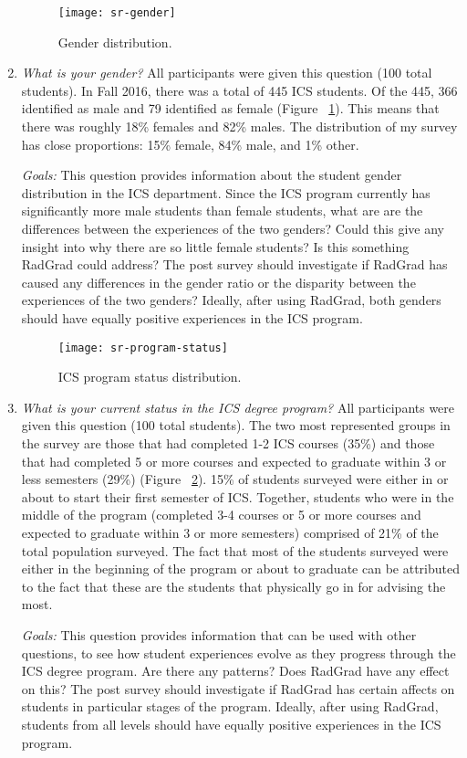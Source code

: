\begin{enumerate}
\begin{figure}[h]
\centering
\texttt{[image: sr-gender]}
\caption{Gender distribution.}
\label{gender}
\end{figure}
\item \textit{What is your gender?}
All participants were given this question (100 total students). In Fall 2016, there was a total of 445 ICS students. Of the 445, 366 identified as male and 79 identified as female (Figure ~\ref{gender}). This means that there was roughly 18\% females and 82\% males. The distribution of my survey has close proportions: 15\% female, 84\% male, and 1\% other. 

\textit{Goals:} This question provides information about the student gender distribution in the ICS department. Since the ICS program currently has significantly more male students than female students, what are are the differences between the experiences of the two genders? Could this give any insight into why there are so little female students? Is this something RadGrad could address? The post survey should investigate if RadGrad has caused any differences in the gender ratio or the disparity between the experiences of the two genders? Ideally, after using RadGrad, both genders should have equally positive experiences in the ICS program.
\begin{figure}[h]
\centering
\texttt{[image: sr-program-status]}
\caption{ICS program status distribution.}
\label{status}
\end{figure}
\item \textit{What is your current status in the ICS degree program?}
All participants were given this question (100 total students). The two most represented groups in the survey are those that had completed 1-2 ICS courses (35\%) and those that had completed 5 or more courses and expected to graduate within 3 or less semesters (29\%) (Figure ~\ref{status}). 15\% of students surveyed were either in or about to start their first semester of ICS. Together, students who were in the middle of the program (completed 3-4 courses or 5 or more courses and expected to graduate within 3 or more semesters) comprised of 21\% of the total population surveyed. The fact that most of the students surveyed were either in the beginning of the program or about to graduate can be attributed to the fact that these are the students that physically go in for advising the most. 

\textit{Goals:} This question provides information that can be used with other questions, to see how student experiences evolve as they progress through the ICS degree program. Are there any patterns? Does RadGrad have any effect on this? The post survey should investigate if RadGrad has certain affects on students in particular stages of the program. Ideally, after using RadGrad, students from all levels should have equally positive experiences in the ICS program. 
\end{enumerate}


